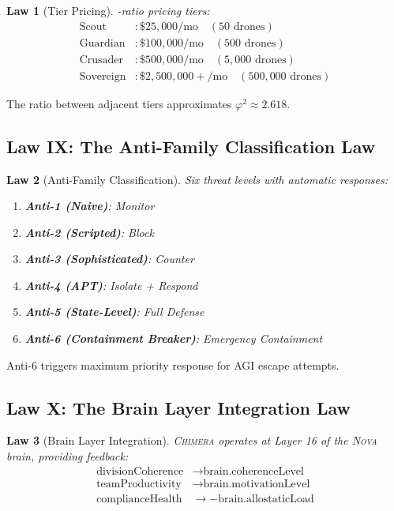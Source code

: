 \documentclass[12pt]{article}
\newtheorem{law}{Law}
\newcommand{\PHI}{\varphi}
\newcommand{\CHIMERA}{\textsc{Chimera}}
\newcommand{\NOVA}{\textsc{Nova}}
\begin{document}
\begin{law}[Tier Pricing]
\PHI-ratio pricing tiers:
\begin{align}
  \text{Scout} &: \$25{,}000/\text{mo} \quad (50 \text{ drones}) \\
  \text{Guardian} &: \$100{,}000/\text{mo} \quad (500 \text{ drones}) \\
  \text{Crusader} &: \$500{,}000/\text{mo} \quad (5{,}000 \text{ drones}) \\
  \text{Sovereign} &: \$2{,}500{,}000+/\text{mo} \quad (500{,}000 \text{ drones})
\end{align}
\end{law}

The ratio between adjacent tiers approximates $\PHI^2 \approx 2.618$.

\subsection{Law IX: The Anti-Family Classification Law}

\begin{law}[Anti-Family Classification]
Six threat levels with automatic responses:
\begin{enumerate}[nosep]
  \item \textbf{Anti-1 (Naive)}: Monitor
  \item \textbf{Anti-2 (Scripted)}: Block
  \item \textbf{Anti-3 (Sophisticated)}: Counter
  \item \textbf{Anti-4 (APT)}: Isolate + Respond
  \item \textbf{Anti-5 (State-Level)}: Full Defense
  \item \textbf{Anti-6 (Containment Breaker)}: Emergency Containment
\end{enumerate}
\end{law}

Anti-6 triggers maximum priority response for AGI escape attempts.

\subsection{Law X: The Brain Layer Integration Law}

\begin{law}[Brain Layer Integration]
\CHIMERA{} operates at Layer 16 of the \NOVA{} brain, providing feedback:
\begin{align}
  \text{divisionCoherence} &\to \text{brain.coherenceLevel} \\
  \text{teamProductivity} &\to \text{brain.motivationLevel} \\
  \text{complianceHealth} &\to -\text{brain.allostaticLoad}
\end{align}
\end{law}
\end{document}
